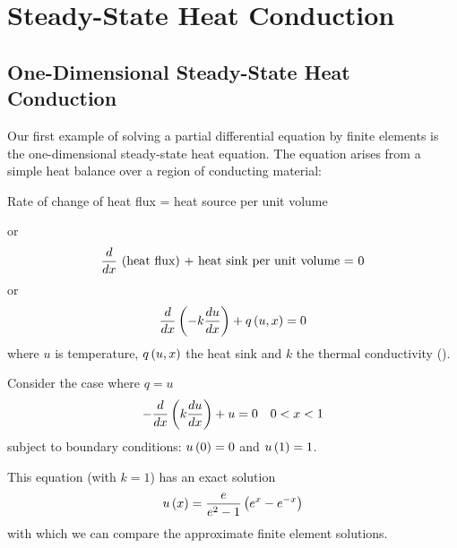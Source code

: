 \chapter{Steady-State Heat Conduction}
\label{cha:steadystate}

\section{One-Dimensional Steady-State Heat Conduction}
\label{sec:OdSSHC-2.1}

Our first example of solving a partial differential equation by finite
elements is the one-dimensional steady-state heat equation. The equation
arises from a simple heat balance over a region of conducting material:

\begin{sloppypar}
  \begin{center}
    Rate of change of heat flux = heat source per unit volume
  \end{center}
  or
  \begin{equation*}
     \dfrac{ d  }{d x} \text{ (heat flux) + heat sink per unit volume = 0}
  \end{equation*}
  or
  \begin{equation*}
     \dfrac{ d  }{d x} \left( -k  \dfrac{ d u}{d x}  \right) +  q\left( u,x \right)  = 0
  \end{equation*}
  where $u$ is temperature, $ q\left( u,x \right) $ the heat sink and $k$ the thermal 
  conductivity ().
\end{sloppypar}

Consider the case where $q=u$ 
\begin{equation}
  - \dfrac{ d  }{d x} \left( k \dfrac{ d u}{d x}  \right) + u = 0 \quad 0<x<1
  \label{eqn:heat_sink}
\end{equation}
subject to boundary conditions: $ u\left( 0 \right) =0$ and $ u\left( 1 \right) =1$. 

This equation (with $k=1$) has an exact solution
\begin{equation}
   u\left( x \right)  = \dfrac{e}{e^{2}-1} \left( e^{x} -e^{-x} \right)
  \label{eqn:h.s.solutn}
\end{equation}
with which we can compare the approximate finite element solutions.

